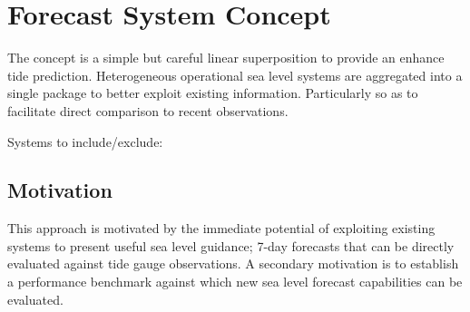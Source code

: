 \documentclass[jmse,article,submit,moreauthors,pdftex,10pt,a4paper]{mdpi}
\begin{document}


\section{Forecast System Concept}

The concept is a simple but careful linear superposition to provide an enhance tide prediction.
Heterogeneous operational sea level systems are aggregated into a single package to better exploit existing information.
Particularly so as to facilitate direct comparison to recent observations.

Systems to include/exclude:\\


\subsection{Motivation}
This approach is motivated by the immediate potential of exploiting existing systems to present useful sea level guidance;  7-day forecasts that can be directly evaluated against tide gauge observations.
A secondary motivation is to establish a performance benchmark against which new sea level forecast capabilities can be evaluated. \\

 
\end{document}
